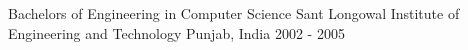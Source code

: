 

\begin{cventries}

  \cventry
    {Bachelors of Engineering in Computer Science} %
    {Sant Longowal Institute of Engineering and Technology} %
    {Punjab, India} %
    {2002 - 2005} %
    {
      \begin{cvitems} %
      \end{cvitems}
    }

\end{cventries}
